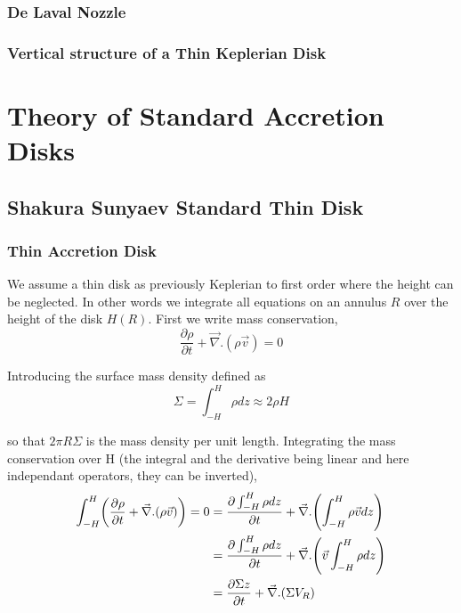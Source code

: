 \documentclass[10pt,a4paper,english,draft]{article}
\let\originalleft\left
\let\originalright\right
\renewcommand{\left}{\mathopen{}\mathclose\bgroup\originalleft}
\renewcommand{\right}{\aftergroup\egroup\originalright}
\begin{document}
\subsubsection{De Laval Nozzle}
\subsubsection{Vertical structure of a Thin Keplerian Disk}

\section{Theory of Standard Accretion Disks}

\subsection{Shakura Sunyaev Standard Thin Disk}

\subsubsection{Thin Accretion Disk}

We assume a thin disk as previously Keplerian to first order where the height
can be neglected. In other words we integrate all equations on an annulus $R$
over the height of the disk $H(R)$. First we write mass conservation,
\begin{equation*}
    \frac{\partial \rho}{\partial t} + \vec{\nabla}.(\rho \vec{v}) = 0
\end{equation*}

Introducing the surface mass density defined as
\begin{equation*}
    \Sigma = \int_{-H}^H \rho dz \approx 2 \rho H
\end{equation*}

so that $2 \pi R \Sigma$ is the mass density per unit length. Integrating the
mass conservation over H (the integral and the derivative being linear and here
independant operators, they can be inverted),
\begin{align*}
    \int_{-H}^H \left( \frac{\partial \rho}{\partial t} + \vec{\nabla}.(\rho \vec{v}) \right) = 0 %
    &= \frac{\partial \int_{-H}^H \rho dz}{\partial t} + \vec{\nabla}.\left( \int_{-H}^H \rho \vec{v} dz \right) \\
    &= \frac{\partial \int_{-H}^H \rho dz}{\partial t} + \vec{\nabla}.\left( \vec{v} \int_{-H}^H \rho dz \right) \\
    &= \frac{\partial \Sigma z}{\partial t} + \vec{\nabla}.(\Sigma V_R)
\end{align*}
\end{document}
